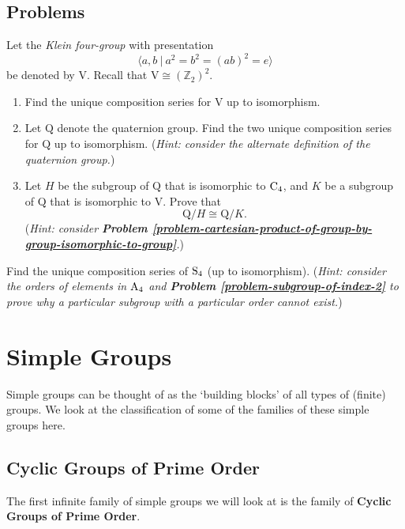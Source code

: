 \section{Problems}
\begin{problem}
    Let the \textit{Klein four-group} with presentation
    \[
        \langle a, b \ | \ a^2 = b^2 = (ab)^2 = e \rangle
    \]
    be denoted by $\mathrm{V}$. Recall that $\mathrm{V} \cong (\mathbb{Z}_2)^2$.
    \begin{enumerate}[label=(\roman*)]
        \item Find the unique composition series for $\mathrm{V}$ up to isomorphism.
        \item Let $\mathrm{Q}$ denote the quaternion group. Find the two unique composition series for $\mathrm{Q}$ up to isomorphism.\newline
        (\textit{Hint: consider the alternate definition of the quaternion group.})
        \item Let $H$ be the subgroup of $\mathrm{Q}$ that is isomorphic to $\mathrm{C}_{4}$, and $K$ be a subgroup of $\mathrm{Q}$ that is isomorphic to $\mathrm{V}$. Prove that
        \[
            \mathrm{Q}/H \cong \mathrm{Q}/K.
        \]
        (\textit{Hint: consider \textbf{Problem \ref{problem-cartesian-product-of-group-by-group-isomorphic-to-group}}.})
    \end{enumerate}
\end{problem}

\begin{problem}
    Find the unique composition series of $\mathrm{S}_{4}$ (up to isomorphism).\newline
    (\textit{Hint: consider the orders of elements in $\mathrm{A}_{4}$ and \textbf{Problem \ref{problem-subgroup-of-index-2}} to prove why a particular subgroup with a particular order cannot exist.})
\end{problem}

\chapter{Simple Groups}
Simple groups can be thought of as the `building blocks' of all types of (finite) groups. We look at the classification of some of the families of these simple groups here.

\section{Cyclic Groups of Prime Order}
The first infinite family of simple groups we will look at is the family of \textbf{Cyclic Groups of Prime Order}.

